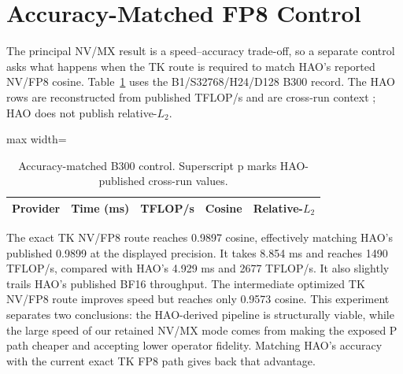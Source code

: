 \section{Accuracy-Matched FP8 Control}
\label{app:accuracy-matched-control}

The principal NV/MX result is a speed--accuracy trade-off, so a separate
control asks what happens when the TK route is required to match HAO's
reported NV/FP8 cosine. Table~\ref{tab:accuracy-matched-control} uses the
B1/S32768/H24/D128 B300 record. The HAO rows are reconstructed from published
TFLOP/s and are cross-run context \cite{hao2026fp4flashattention}; HAO does
not publish relative-$L_2$.

\begin{table}[ht]
\centering
\caption{Accuracy-matched B300 control. Superscript p marks HAO-published
cross-run values.}
\label{tab:accuracy-matched-control}
\scriptsize
\begin{adjustbox}{max width=\columnwidth}
\begin{tabular}{lrrrr}
\toprule
Provider & Time (ms) & TFLOP/s & Cosine & Relative-$L_2$ \\
\midrule
%
\end{tabular}
\end{adjustbox}
\end{table}

The exact TK NV/FP8 route reaches 0.9897 cosine, effectively matching HAO's
published 0.9899 at the displayed precision. It takes 8.854 ms and reaches
1490 TFLOP/s, compared with HAO's 4.929 ms and 2677 TFLOP/s. It also slightly
trails HAO's published BF16 throughput. The intermediate optimized TK NV/FP8
route improves speed but reaches only 0.9573 cosine. This experiment separates
two conclusions: the HAO-derived pipeline is structurally viable, while the
large speed of our retained NV/MX mode comes from making the exposed P path
cheaper and accepting lower operator fidelity. Matching HAO's accuracy with
the current exact TK FP8 path gives back that advantage.
